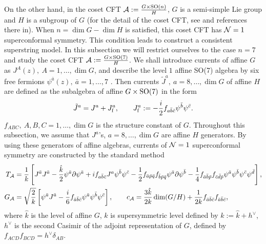 \documentclass[a4paper,12pt]{article}
\numberwithin{equation}{section}
\newcommand{\Ncal}{{\cal N}}
\newcommand{\del}{\partial}
\newcommand{\Acal}{{\cal A}}
\newcommand{\nn}{\nonumber}
\newcommand{\SO}[1]{{\rm SO}(#1)}
\newcommand{\kh}{\hat{k}}
\newcommand{\Jh}{J}
\newcommand{\Jt}{\tilde{J}}
\newcommand{\Jf}{J_{\rm f}}
\renewcommand{\k}{k}
\newcommand{\hc}{{h^{\vee}}}
\newcommand{\h}[1]{#1}
\newcommand{\gh}[1]{\bar{#1}}
\renewcommand{\aa}{\h a}
\newcommand{\ab}{\gh a}
\newcommand{\bb}{\gh b}
\newcommand{\cb}{\gh c}
\newcommand{\db}{\gh d}
\newcommand{\pb}{\gh p}
\newcommand{\qb}{\gh q}
\begin{document}
On the other hand, in the coset CFT $\Acal:=\frac{G\times \SO n}{H}$,
$G$ is a semi-simple Lie group and $H$ is a subgroup of $G$ 
 (for the detail of the coset CFT, see \cite{Halpern:1996js} and references there in).
When $n=\dim G-\dim H$ is satisfied, this coset CFT has $\Ncal=1$
superconformal symmetry\cite{Kazama:1989qp}. 
This condition leads to 
construct a consistent superstring model. In this subsection we will 
restrict ourselves to
the case $n=7$
and study the coset CFT $\Acal:=\frac{G\times \SO 7}{H}$.
We shall introduce currents of affine $G$ as $\Jh^{A}(z),\ A=1,\dots,\dim G$,
and describe the level $1$ affine \SO 7 algebra by six free fermions
 $\psi^{\ab}(z),\ \ab=1,\dots,7$ . Then currents  $\Jt^{\aa},\
 \aa=8,\dots,\dim G$
of affine $H$ are defined as 
the subalgebra of affine $G\times \SO 7$ in the form
\begin{align}
 \Jt^{\aa}=\Jh^{\aa}+\Jf^{\aa},\qquad
 \Jf^{\aa}:=-\frac{i}{2}f_{\aa\bb\cb}\psi^{\bb}\psi^{\cb}.\label{G2Jf}
\end{align}
$f_{ABC},\ A,B,C=1,\dots,\dim G $ is the structure constant of
$G$.  Throughout this subsection, we assume that $\Jh^{\aa}$'s, 
$\aa=8,\dots,\dim G$ are affine
$H$ generators.  By using these generators of affine algebras, 
currents of $\Ncal=1$ superconformal symmetry are
constructed by the standard method
\begin{align}
   T_{\Acal}
          &=\frac1k\left[
               \Jh^{\ab}\Jh^{\ab}-\frac{\kh}{2}\psi^{\ab}\del\psi^{\ab}
           +if_{\aa\bb\cb}\Jh^{\aa}\psi^{\bb}\psi^{\cb}
           -\frac12 f_{\ab\pb\qb}f_{\bb\pb\qb}\psi^{\ab}\del\psi^{\bb}
           -\frac14 f_{\ab\bb\pb}f_{\cb\db\pb}
                     \psi^{\ab}\psi^{\bb}\psi^{\cb}\psi^{\db}
                   \right],\nn\\
    G_{\Acal}
         &=\sqrt{\frac{2}{k}}\left[\psi^{\ab}\Jh^{\ab}
          -\frac i6f_{\ab\bb\cb}\psi^{\ab}\psi^{\bb}\psi^{\cb}
         \right],\qquad
   c_{\Acal}
        =\frac{3\kh}{2k}\dim(G/H)+\frac{1}{2k}f_{\ab\bb\cb}f_{\ab\bb\cb},
\label{2-4}
\end{align}
where $\kh$ is the level of affine $G$, $\k$ is supersymmetric level
defined by $\k:=\kh+\hc$, $\hc$ is the second Casimir of the adjoint
representation of $G$, defined by $f_{ACD}f_{BCD}=\hc\delta_{AB}$.
\end{document}
